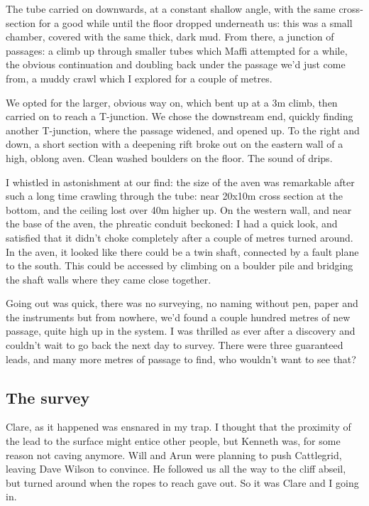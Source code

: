 The tube carried on downwards, at a constant shallow angle, with the same cross-section for a good while until the floor dropped underneath us: this was a small chamber, covered with the same thick, dark mud. From there, a junction of passages: a climb up through smaller tubes which Maffi attempted for a while, the obvious continuation and doubling back under the passage we’d just come from, a muddy crawl which I explored for a couple of metres. 

We opted for the larger, obvious way on, which bent up at a 3m climb, then carried on to reach a T-junction. We chose the downstream end, quickly finding another T-junction, where the passage widened, and opened up. To the right and down, a short section with a deepening rift broke out on the eastern wall of a high, oblong aven. Clean washed boulders on the floor. The sound of drips. 

I whistled in astonishment at our find: the size of the aven was remarkable after such a long time crawling through the tube: near 20x10m cross section at the bottom, and the ceiling lost over 40m higher up. On the western wall, and near the base of the aven, the phreatic conduit beckoned: I had a quick look, and satisfied that it didn’t choke completely after a couple of metres turned around. In the aven, it looked like there could be a twin shaft, connected by a fault plane to the south. This could be accessed by climbing on a boulder pile and bridging the shaft walls where they came close together.

Going out was quick, there was no surveying, no naming without pen, paper and the instruments but from nowhere, we’d found a couple hundred metres of new passage, quite high up in the system. I was thrilled as ever after a discovery and couldn’t wait to go back the next day to survey. There were three guaranteed leads, and many more metres of passage to find, who wouldn’t want to see that?

\subsection{The survey}
Clare, as it happened was ensnared in my trap. I thought that the proximity of the lead to the surface might entice other people, but Kenneth was, for some reason not caving anymore. Will and Arun were planning to push Cattlegrid, leaving Dave Wilson to convince. He followed us all the way to the cliff abseil, but turned around when the ropes to reach  gave out. So it was Clare and I going in. 

